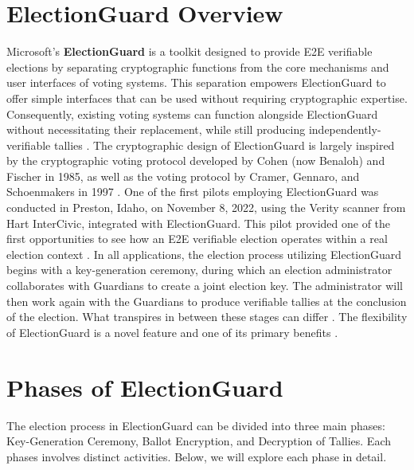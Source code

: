 \section{ElectionGuard Overview}
Microsoft's \textbf{ElectionGuard} is a toolkit designed to provide \ac{E2E} verifiable elections by separating cryptographic functions from the core mechanisms and user interfaces of voting systems. This separation empowers ElectionGuard to offer simple interfaces that can be used without requiring cryptographic expertise. Consequently, existing voting systems can function alongside ElectionGuard without necessitating their replacement, while still producing independently-verifiable tallies \cite[1-2]{eg-paper}. The cryptographic design of ElectionGuard is largely inspired by the cryptographic voting protocol developed by Cohen (now Benaloh) and Fischer in 1985, as well as the voting protocol by Cramer, Gennaro, and Schoenmakers in 1997 \cite[5]{eg-paper}. One of the first pilots employing ElectionGuard was conducted in Preston, Idaho, on November 8, 2022, using the Verity scanner from Hart InterCivic, integrated with ElectionGuard. This pilot provided one of the first opportunities to see how an E2E verifiable election operates within a real election context \cite[4]{e2e-pilot}. In all applications, the election process utilizing ElectionGuard begins with a key-generation ceremony, during which an election administrator collaborates with Guardians to create a joint election key. The administrator will then work again with the Guardians to produce verifiable tallies at the conclusion of the election. What transpires in between these stages can differ \cite[20]{eg-paper}. The flexibility of ElectionGuard is a novel feature and one of its primary benefits \cite[22]{eg-paper}.

\section{Phases of ElectionGuard}
The election process in ElectionGuard can be divided into three main phases: Key-Generation Ceremony, Ballot Encryption, and Decryption of Tallies. Each phases involves distinct activities. Below, we will explore each phase in detail.

